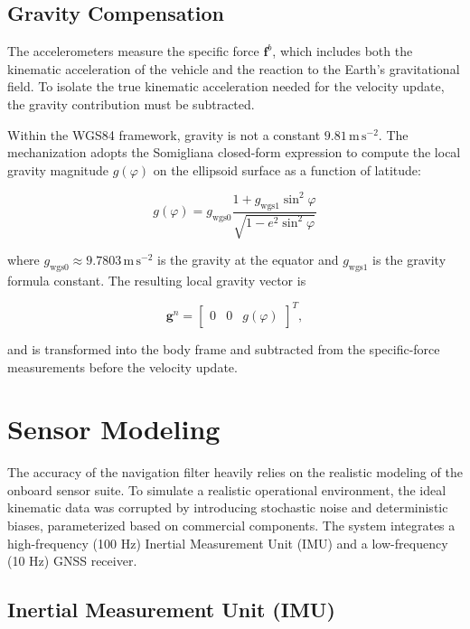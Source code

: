\documentclass[a4paper,twoside,openany]{report}
\begin{document}
\section{Gravity Compensation}

The accelerometers measure the specific force $\mathbf{f}^b$, which includes both the kinematic acceleration of the vehicle and the reaction to the Earth's gravitational field. To isolate the true kinematic acceleration needed for the velocity update, the gravity contribution must be subtracted.

Within the WGS84 framework, gravity is not a constant $9.81\,\mathrm{m\,s^{-2}}$. The mechanization adopts the Somigliana closed-form expression to compute the local gravity magnitude $g(\varphi)$ on the ellipsoid surface as a function of latitude:

\begin{equation}
    g(\varphi) = g_{\mathrm{wgs0}} \frac{1 + g_{\mathrm{wgs1}} \sin^2\varphi}{\sqrt{1 - e^2 \sin^2\varphi}}
    \label{eq:gravity}
\end{equation}

where $g_{\mathrm{wgs0}} \approx 9.7803\,\mathrm{m\,s^{-2}}$ is the gravity at the equator and $g_{\mathrm{wgs1}}$ is the gravity formula constant. The resulting local gravity vector is

\begin{equation}
    \mathbf{g}^n = \begin{bmatrix} 0 & 0 & g(\varphi) \end{bmatrix}^T,
    \label{eq:gravity_vector}
\end{equation}

and is transformed into the body frame and subtracted from the specific-force measurements before the velocity update.

\chapter{Sensor Modeling}

The accuracy of the navigation filter heavily relies on the realistic modeling of the onboard sensor suite. To simulate a realistic operational environment, the ideal kinematic data was corrupted by introducing stochastic noise and deterministic biases, parameterized based on commercial components. The system integrates a high-frequency (100 Hz) Inertial Measurement Unit (IMU) and a low-frequency (10 Hz) GNSS receiver.

\section{Inertial Measurement Unit (IMU)}
\end{document}

